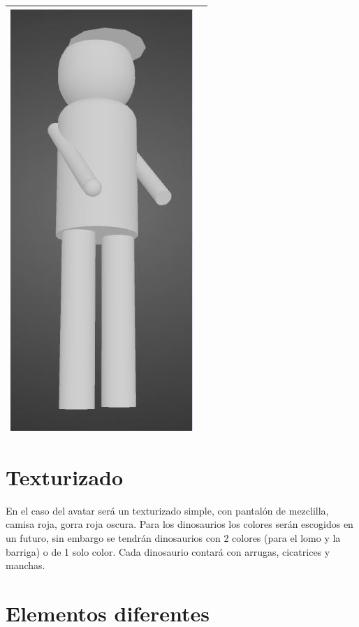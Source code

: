\documentclass[12pt]{article} %
\begin{document}
\begin{center}
\begin{tabular}{ | m{19em} | m{19em} | }
		 	\includegraphics[scale=0.5]{images/Avatar.JPG} \\  
			\hline
		\end{tabular}
	\end{center}

	\newpage
	
	\section{Texturizado}
	
	\setlength{\parindent}{1.0cm}
	En el caso del avatar será un texturizado simple, con pantalón de mezclilla, camisa roja, gorra roja oscura. 
	Para los dinosaurios los colores serán escogidos en un futuro, sin embargo se tendrán dinosaurios con 2 colores 
	(para el lomo y la barriga) o de 1 solo color. Cada dinosaurio contará con arrugas, cicatrices y manchas.
	\setlength{\parindent}{0.0cm}
	
	\section{Elementos diferentes}
	
\end{document}
